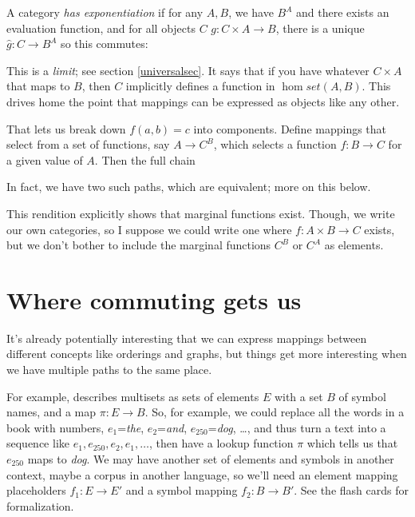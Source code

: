 \documentclass[11pt]{article}
\begin{document}
A category {\em has exponentiation} if for any $A, B$, we have $B^A$ and there exists
an evaluation function, and for all objects $C$ 
$g:C\times A \to B$, there is a unique $\hat g:C\to B^A$ so this commutes:


This is a {\em limit}; see section \ref{universalsec}. It
says that if you have whatever $C\times A$ that maps to $B$, then $C$ implicitly defines a
function in $\hom{set}(A,B)$. This drives home the point that mappings can be expressed as
objects like any other.

That lets us break down $f(a,b)=c$ into components.
Define mappings that select from a set of functions, say $A\to C^B$,
which selects a function $f:B\to C$ for a given value of $A$. Then the full chain

In fact, we have two such paths, which are equivalent; more on this below.


This rendition explicitly shows that marginal functions exist. Though, we write
our own categories, so I suppose we could write one where $f:A\times B\to C$ exists,
but we don't bother to include the marginal functions $C^B$ or $C^A$ as elements.


\section{Where commuting gets us} It's already potentially interesting that we can
express mappings between different concepts like orderings and graphs, but things get more
interesting when we have multiple paths to the same place.

For example,
\citet{spivak:category} describes multisets as sets of elements $E$ with a set $B$ of
symbol names, and a map $\pi:E\to B$. So, for example, we could replace all the words in a
book with numbers, $e_1$={\em the}, $e_2$={\em and}, $e_{250}$={\em dog}, \dots, and thus
turn a text into a sequence like $e_1, e_{250}, e_2, e_1, \dots$, then have a lookup
function $\pi$ which tells us that $e_{250}$ maps to {\em dog}. We
may have another set of elements and symbols in another context, maybe a corpus in
another language, so we'll need an element mapping placeholders $f_1:E\to E'$ and a symbol mapping
$f_2:B\to B'$. See the flash cards for formalization.
\end{document}
